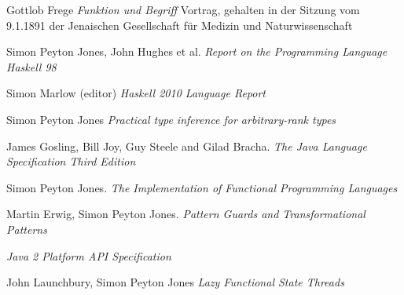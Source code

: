 \documentclass[lletterpaper,12pt]{report}
\begin{document}





%


\appendix


\begin{thebibliography}{99}

 Gottlob Frege \emph{Funktion und Begriff} 
\small{Vortrag, gehalten in der Sitzung vom 9.1.1891 der Jenaischen Gesellschaft für Medizin und Naturwissenschaft}

 Simon Peyton Jones,
John Hughes et al. \emph{Report on the Programming Language
Haskell 98}

 Simon Marlow (editor) \emph{Haskell 2010 Language Report}

 Simon Peyton Jones \emph{Practical type
inference for arbitrary-rank types}

 James Gosling, Bill Joy, Guy Steele and
Gilad Bracha. \emph{The Java Language Specification Third
Edition}

 Simon Peyton Jones. \emph{The Implementation of
Functional Programming Languages}

 Martin Erwig, Simon Peyton Jones. \emph{Pattern
Guards and Transformational Patterns}

 \emph{Java 2 Platform API Specification}

 John Launchbury, Simon Peyton Jones \emph{Lazy Functional State Threads}

\end{thebibliography}


\printindex

\end{document}
